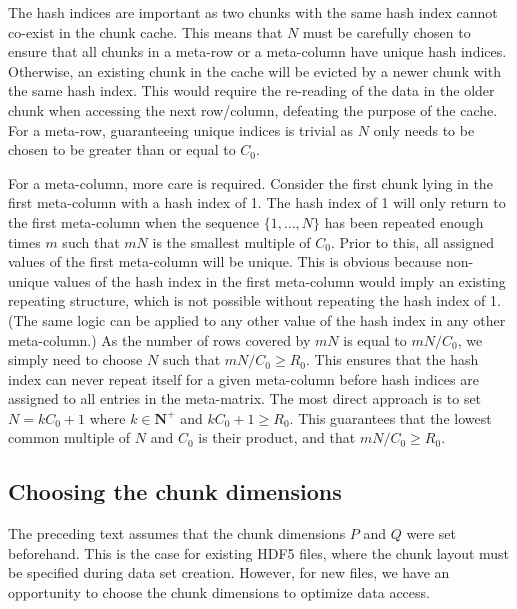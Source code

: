 \documentclass{article}
\begin{document}
The hash indices are important as two chunks with the same hash index cannot co-exist in the chunk cache.
This means that $N$ must be carefully chosen to ensure that all chunks in a meta-row or a meta-column have unique hash indices.
Otherwise, an existing chunk in the cache will be evicted by a newer chunk with the same hash index.
This would require the re-reading of the data in the older chunk when accessing the next row/column, defeating the purpose of the cache.
For a meta-row, guaranteeing unique indices is trivial as $N$ only needs to be chosen to be greater than or equal to $C_0$.

For a meta-column, more care is required.
Consider the first chunk lying in the first meta-column with a hash index of 1.
The hash index of 1 will only return to the first meta-column when the sequence $\{1, \ldots, N\}$ has been repeated enough times $m$ such that $mN$ is the smallest multiple of $C_0$.
Prior to this, all assigned values of the first meta-column will be unique.
This is obvious because non-unique values of the hash index in the first meta-column would imply an existing repeating structure, which is not possible without repeating the hash index of 1.
(The same logic can be applied to any other value of the hash index in any other meta-column.)
As the number of rows covered by $mN$ is equal to $mN/C_0$, we simply need to choose $N$ such that $mN/C_0 \ge R_0$.
This ensures that the hash index can never repeat itself for a given meta-column before hash indices are assigned to all entries in the meta-matrix.
The most direct approach is to set $N = kC_0 + 1$  where $k \in \mathbf{N}^+$ and $kC_0 +1 \ge R_0$.
This guarantees that the lowest common multiple of $N$ and $C_0$ is their product, and that $mN/C_0 \ge R_0$.

\subsection{Choosing the chunk dimensions}
The preceding text assumes that the chunk dimensions $P$ and $Q$ were set beforehand.
This is the case for existing HDF5 files, where the chunk layout must be specified during data set creation.
However, for new files, we have an opportunity to choose the chunk dimensions to optimize data access.
\end{document}
